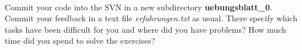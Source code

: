 \\
Commit your code into the SVN in a new subdirectory 
\textbf{uebungsblatt\_0\ExerciseSheetNumber}. Commit your feedback in a text file 
\emph{erfahrungen.txt} as usual. There specify which tasks have been difficult for you and where did you have problems? How much time did you spend to solve the exercises?
